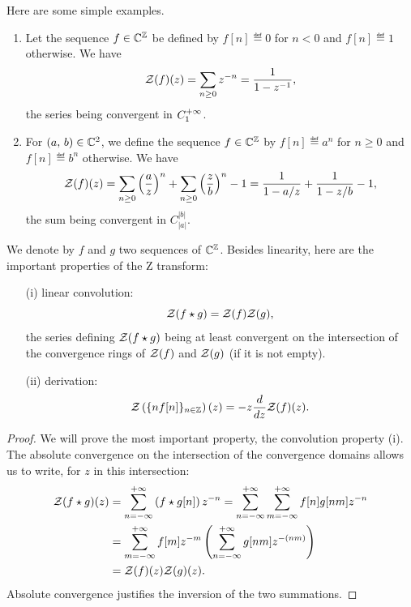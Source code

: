  
\begin{exmp}
Here are some simple examples. \begin{enumerate}
\item Let the sequence $ f \in \mathbb{C}^{\mathbb{Z}} $ be defined by $ f [n] \eqdef 0 $ for $ n <0 $ and $ f [n] \eqdef 1 $ otherwise. We have
\begin{equation*}
\mathcal{Z} (f) (z) = \sum_{n \geq 0}{z^{- n}} = \frac{1}{1-z^{-1}},
\end{equation*}
the series being convergent in $ C_1^{+\infty} $.
\item For $ (a, \, b) \in \mathbb{C}^2 $, we define the sequence $ f \in \mathbb{C}^{\mathbb{Z}} $ by $ f [n] \eqdef a^n $ for $ n \ge 0 $ and $ f [n] \eqdef b^n $ otherwise. We have
\begin{equation*}
\mathcal{Z} (f) (z) = \sum_{n \geq 0}{\left(\frac{a}{z} \right)^n} + \sum_{n \geq 0}{\left(\frac{z}{b} \right)^n} - 1 = \frac{1}{1 - a / z} + \frac{1}{1 - z / b} - 1,
\end{equation*}
the sum being convergent in $ C_{| a |}^{| b |} $.
\end{enumerate}
\end{exmp}
 
 
\begin{prop}
\label{prop-prte-z-trans}
We denote by $ f $ and $ g $ two sequences of $ \mathbb{C}^{\mathbb{Z}} $. Besides linearity, here are the important properties of the Z transform: \begin{itemize}
\item [{\upshape (i)}] linear convolution:
\begin{equation*}
\mathcal{Z} (f \star g) = \mathcal{Z} (f) \mathcal{Z} (g),
\end{equation*}
the series defining $ \mathcal{Z} (f \star g) $ being at least convergent on the intersection of the convergence rings of $ \mathcal{Z} (f) $ and $ \mathcal{Z} (g) $ (if it is not empty).
\item [{\upshape (ii)}] derivation:
\begin{equation*}
\mathcal{Z} \left(\{nf [n] \}_{n \in \mathbb{Z}} \right) (z) = - z \frac{d}{dz} \mathcal{Z} (f) (z).
\end{equation*}
\end{itemize}
\end{prop}
\begin{proof}
We will prove the most important property, the convolution property (i). The absolute convergence on the intersection of the convergence domains allows us to write, for $ z $ in this intersection:
\begin{equation*}
\begin{split}
\mathcal{Z} (f \star g) (z) & = \sum_{n = -\infty}^{+\infty}{\left(f \star g [n] \right) z^{- n}} = \sum_{n = -\infty}^{+\infty}{\sum_{m = -\infty}^{+\infty}{f [n] g [nm] z^{- n}}} \\
& = \sum_{m = -\infty}^{+\infty}{f [m] z^{- m}} \left(\sum_{n = -\infty}^{+\infty}{g [nm] z^{- (nm)}} \right) \\
& = \mathcal{Z} (f) (z) \mathcal{Z} (g) (z).
\end{split}
\end{equation*}
Absolute convergence justifies the inversion of the two summations.
\end{proof}
 
